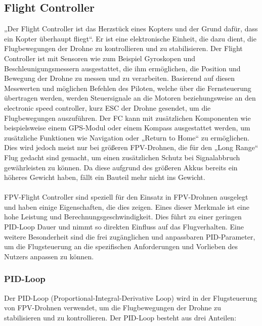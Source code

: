     \subsection[Flight Controller]{Flight Controller}
        „Der Flight Controller ist das Herzstück eines Kopters und der Grund dafür, dass ein Kopter
        überhaupt fliegt“. Er ist eine elektronische Einheit, die dazu dient, die Flugbewegungen der
        Drohne zu kontrollieren und zu stabilisieren. Der Flight Controller ist mit Sensoren wie zum
        Beispiel Gyroskopen und Beschleunigungsmessern ausgestattet, die ihm ermöglichen, die Position
        und Bewegung der Drohne zu messen und zu verarbeiten. Basierend auf diesen Messwerten und möglichen
        Befehlen des Piloten, welche über die Fernsteuerung übertragen werden, werden Steuersignale an
        die Motoren beziehungsweise an den electronic speed controller, kurz ESC der Drohne gesendet,
        um die Flugbewegungen auszuführen. Der FC kann mit zusätzlichen Komponenten wie beispielsweise
        einem GPS-Modul oder einem Kompass ausgestattet werden, um zusätzliche Funktionen wie Navigation
        oder „Return to Home“ zu ermöglichen. Dies wird jedoch meist nur bei größeren FPV-Drohnen, die
        für den „Long Range“ Flug gedacht sind gemacht, um einen zusätzlichen Schutz bei Signalabbruch
        gewährleisten zu können. Da diese aufgrund des größeren Akkus bereits ein höheres Gewicht haben,
        fällt ein Bauteil mehr nicht ins Gewicht. \\
        \\
        FPV-Flight Controller sind speziell für den Einsatz in FPV-Drohnen ausgelegt und haben einige
        Eigenschaften, die dies zeigen. Eines dieser Merkmale ist eine hohe Leistung und Berechnungsgeschwindigkeit.
        Dies führt zu einer geringen PID-Loop Dauer und nimmt so direkten Einfluss auf das Flugverhalten.
        Eine weitere Besonderheit sind die frei zugänglichen und anpassbaren PID-Parameter, um die Flugsteuerung
        an die spezifischen Anforderungen und Vorlieben des Nutzers anpassen zu können.
    
        \subsubsection[PID-Loop]{PID-Loop}
            Der PID-Loop (Proportional-Integral-Derivative Loop) wird in der Flugsteuerung von FPV-Drohnen verwendet, um die
            Flugbewegungen der Drohne zu stabilisieren und zu kontrollieren. Der PID-Loop besteht aus drei Anteilen:

